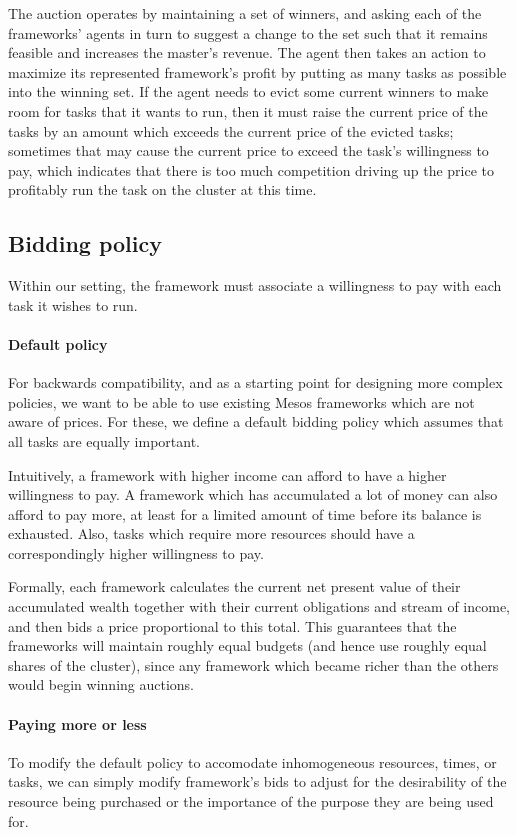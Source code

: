 \documentclass{acm_proc_article-sp}
\begin{document}
The auction operates by maintaining a set of winners, and asking each of
the frameworks' agents in turn to suggest a change to the set such that it
remains feasible and increases the master's revenue. The agent then takes an
action to maximize its represented framework's profit by putting as many tasks
as possible into the winning set. If the agent needs to evict some current
winners to make room for tasks that it wants to run, then it must raise the
current price of the tasks by an amount which exceeds the current price of the
evicted tasks; sometimes that may cause the current price to exceed the task's
willingness to pay, which indicates that there is too much competition driving
up the price to profitably run the task on the cluster at this time.

\subsection{Bidding policy}
Within our setting, the framework must associate a willingness to pay with each
task it wishes to run. 

\paragraph{Default policy} For backwards compatibility, 
and as a starting point for designing more complex policies, we want to be able to
use existing Mesos frameworks which are not aware of prices. For these, we
define a default bidding policy which assumes that all tasks are equally
important.

Intuitively, a framework with higher income can afford to have a higher
willingness to pay. A framework which has accumulated a lot of money can also
afford to pay more, at least for a limited amount of time before its balance is
exhausted. Also, tasks which require more resources should have a
correspondingly higher willingness to pay.

Formally, each framework calculates the current net present value
of their accumulated wealth together with their current obligations
and stream of income, and then bids a price proportional
to this total. This guarantees that the frameworks will
maintain roughly equal budgets (and hence use roughly equal shares
of the cluster), since any framework which became richer
than the others would begin winning auctions.

\paragraph{Paying more or less} To modify the 
default policy to accomodate inhomogeneous resources,
times, or tasks, we can simply modify framework's
bids to adjust for the desirability of the resource being
purchased or the importance of the purpose they are being used for.
\end{document}
